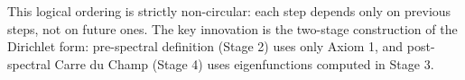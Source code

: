 \begin{remark}
This logical ordering is strictly non-circular: each step depends only on previous steps, not on future ones. The key innovation is the two-stage construction of the Dirichlet form: pre-spectral definition (Stage 2) uses only Axiom 1, and post-spectral Carre du Champ (Stage 4) uses eigenfunctions computed in Stage 3.
\end{remark}

